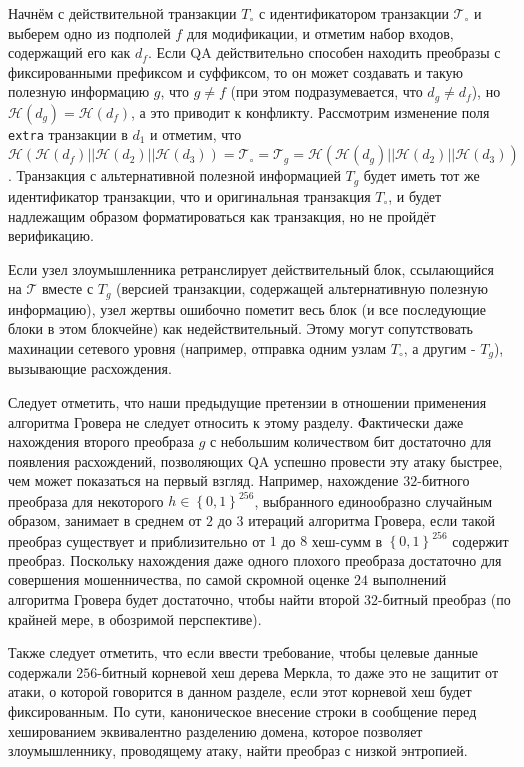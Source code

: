 \documentclass{mrl}
\begin{document}
Начнём с действительной транзакции $T_\circ$ с идентификатором транзакции $\mathcal{T}_\circ$ и выберем одно из подполей $f$ для модификации, и отметим набор входов, содержащий его как $d_f$. Если QA действительно способен находить преобразы с фиксированными префиксом и суффиксом, то он может создавать и такую полезную информацию $g$, что $g \not=f$ (при этом подразумевается, что $d_{g} \not= d_f$), но $\mathcal{H}(d_{g}) = \mathcal{H}(d_f)$, а это приводит к конфликту. Рассмотрим изменение поля \texttt{extra} транзакции в $d_1$ и отметим, что $\mathcal{H}(\mathcal{H}(d_f)||\mathcal{H}(d_2)||\mathcal{H}(d_3)) = \mathcal{T}_\circ = \mathcal{T}_g  = \mathcal{H}(\mathcal{H}(d_g)||\mathcal{H}(d_2)||\mathcal{H}(d_3))$. Транзакция с альтернативной полезной информацией $T_g$ будет иметь тот же идентификатор транзакции, что и оригинальная транзакция $T_\circ$, и будет надлежащим образом форматироваться как транзакция, но не пройдёт верификацию.

Если узел злоумышленника ретранслирует действительный блок, ссылающийся на $\mathcal{T}$ вместе с $T_g$ (версией транзакции, содержащей альтернативную полезную информацию), узел жертвы ошибочно пометит весь блок (и все последующие блоки в этом блокчейне) как недействительный. Этому могут сопутствовать махинации сетевого уровня (например, отправка одним узлам $T_\circ$, а другим - $T_g$), вызывающие расхождения.
 
Следует отметить, что наши предыдущие претензии в отношении применения алгоритма Гровера не следует относить к этому разделу. Фактически даже нахождения второго преобраза $g$ с небольшим количеством бит достаточно для появления расхождений, позволяющих QA успешно провести эту атаку быстрее, чем может показаться на первый взгляд. Например, нахождение $32$-битного преобраза для некоторого $h \in \left\{0,1\right\}^{256}$, выбранного единообразно случайным образом, занимает в среднем от $2$ до $3$ итераций алгоритма Гровера, если такой преобраз существует и приблизительно от $1$ до $8$ хеш-сумм в $\left\{0,1\right\}^{256}$ содержит преобраз. Поскольку нахождения даже одного плохого преобраза достаточно для совершения мошенничества, по самой скромной оценке $24$ выполнений алгоритма Гровера будет достаточно, чтобы найти второй $32$-битный преобраз (по крайней мере, в обозримой перспективе).
 
Также следует отметить, что если ввести требование, чтобы целевые данные содержали $256$-битный корневой хеш дерева Меркла, то даже это не защитит от атаки, о которой говорится в данном разделе, если этот корневой хеш будет фиксированным. По сути, каноническое внесение строки в сообщение перед хешированием эквивалентно разделению домена, которое позволяет злоумышленнику, проводящему атаку, найти преобраз с низкой энтропией.
\end{document}
